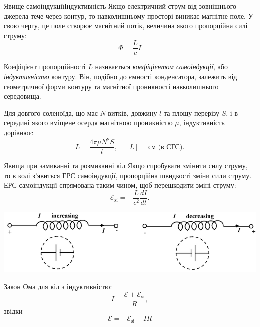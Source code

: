 \documentclass{beamer}
\begin{document}
\begin{frame}{Явище самоіндукції}{Індуктивність}
	Якщо електричний струм від зовнішнього джерела тече через контур, то навколишньому просторі виникає магнітне поле. У свою чергу, це поле створює магнітний потік, величина якого пропорційна силі струму:
	\begin{equation*}
		\Phi = \frac{L}{c} I
	\end{equation*}

	Коефіцієнт пропорційності $ L $ називається \emph{коефіцієнтом самоіндукції}, або \emph{індуктивністю} контуру. Він, подібно до ємності конденсатора,
	залежить від геометричної форми контуру та магнітної проникності навколишнього середовища.

	Для довгого соленоїда, що має $ N $ витків, довжину $ l $ та площу перерізу $ S $, і в середині якого вміщене осердя магнітною проникністю $ \mu $, індуктивність дорівнює:
	\begin{equation*}
		L = \frac{4\pi\mu N^2 S}{l}, \quad [L] = \text{см (в СГС)}.
	\end{equation*}

\end{frame}




\begin{frame}{Явища при замиканні та розмиканні кіл}
	Якщо спробувати змінити силу струму, то в колі з'явиться ЕРС  самоіндукції, пропорційна швидкості зміни сили струму. ЕРС самоіндукції спрямована таким чином, щоб перешкодити зміні струму:
	\begin{equation*}
		\mathcal{E}_\text{si} = - \frac{L}{c^2}\frac{dI}{dt}.
	\end{equation*}
	\begin{center}
		\includegraphics[width=0.75\linewidth]{addsource}
	\end{center}

	Закон Ома для кіл з індуктивністю:
	\begin{equation*}
		I = \frac{\mathcal{E} + \mathcal{E}_\text{si}}{R},
	\end{equation*}
	звідки
	\begin{equation*}
		\mathcal{E} = - \mathcal{E}_\text{si} + IR
	\end{equation*}
\end{frame}
\end{document}
